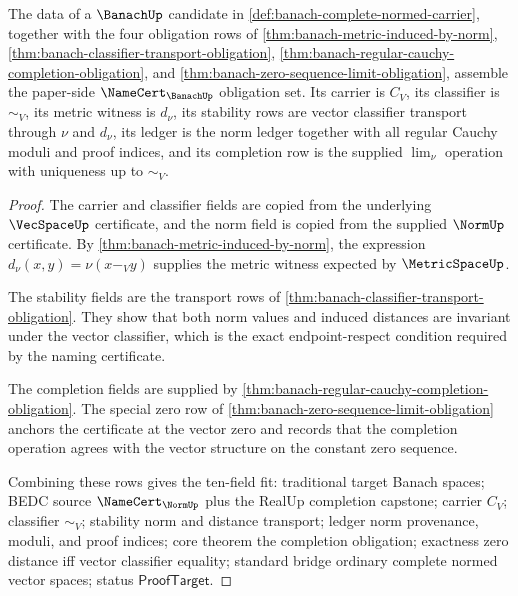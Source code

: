 \begin{theorem}
\label{thm:banach-certificate-obligation-assembly}
The data of a $\BanachUp$ candidate in
\autoref{def:banach-complete-normed-carrier}, together with the four obligation
rows of
\autoref{thm:banach-metric-induced-by-norm},
\autoref{thm:banach-classifier-transport-obligation},
\autoref{thm:banach-regular-cauchy-completion-obligation}, and
\autoref{thm:banach-zero-sequence-limit-obligation}, assemble the paper-side
$\NameCert_{\BanachUp}$ obligation set. Its carrier is $C_V$, its classifier is
$\sim_V$, its metric witness is $d_\nu$, its stability rows are vector
classifier transport through $\nu$ and $d_\nu$, its ledger is the norm ledger
together with all regular Cauchy moduli and proof indices, and its completion
row is the supplied $\lim_\nu$ operation with uniqueness up to $\sim_V$.
\end{theorem}
\begin{proof}
The carrier and classifier fields are copied from the underlying
$\VecSpaceUp$ certificate, and the norm field is copied from the supplied
$\NormUp$ certificate. By
\autoref{thm:banach-metric-induced-by-norm}, the expression
$d_\nu(x,y)=\nu(x-_V y)$ supplies the metric witness expected by
$\MetricSpaceUp$.

The stability fields are the transport rows of
\autoref{thm:banach-classifier-transport-obligation}. They show that both
norm values and induced distances are invariant under the vector classifier,
which is the exact endpoint-respect condition required by the naming
certificate.

The completion fields are supplied by
\autoref{thm:banach-regular-cauchy-completion-obligation}. The special zero
row of \autoref{thm:banach-zero-sequence-limit-obligation} anchors the
certificate at the vector zero and records that the completion operation agrees
with the vector structure on the constant zero sequence.

Combining these rows gives the ten-field fit: traditional target Banach
spaces; BEDC source $\NameCert_{\NormUp}$ plus the RealUp completion capstone;
carrier $C_V$; classifier $\sim_V$; stability norm and distance transport;
ledger norm provenance, moduli, and proof indices; core theorem the completion
obligation; exactness zero distance iff vector classifier equality; standard
bridge ordinary complete normed vector spaces; status $\mathsf{ProofTarget}$.
\end{proof}

